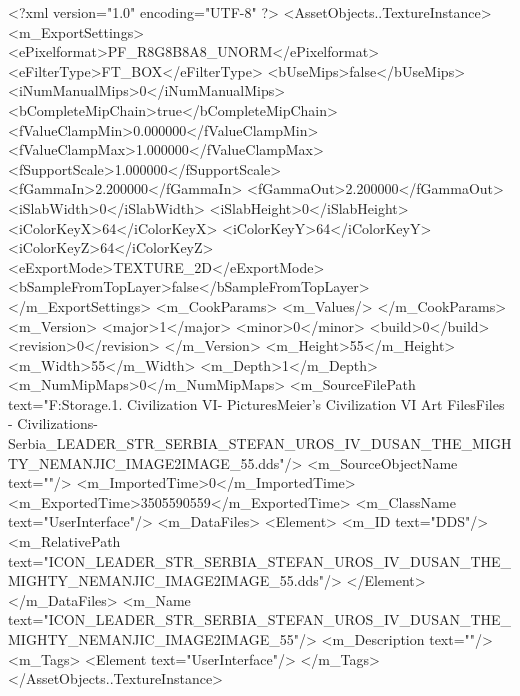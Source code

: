 <?xml version="1.0" encoding="UTF-8" ?>
<AssetObjects..TextureInstance>
	<m_ExportSettings>
		<ePixelformat>PF_R8G8B8A8_UNORM</ePixelformat>
		<eFilterType>FT_BOX</eFilterType>
		<bUseMips>false</bUseMips>
		<iNumManualMips>0</iNumManualMips>
		<bCompleteMipChain>true</bCompleteMipChain>
		<fValueClampMin>0.000000</fValueClampMin>
		<fValueClampMax>1.000000</fValueClampMax>
		<fSupportScale>1.000000</fSupportScale>
		<fGammaIn>2.200000</fGammaIn>
		<fGammaOut>2.200000</fGammaOut>
		<iSlabWidth>0</iSlabWidth>
		<iSlabHeight>0</iSlabHeight>
		<iColorKeyX>64</iColorKeyX>
		<iColorKeyY>64</iColorKeyY>
		<iColorKeyZ>64</iColorKeyZ>
		<eExportMode>TEXTURE_2D</eExportMode>
		<bSampleFromTopLayer>false</bSampleFromTopLayer>
	</m_ExportSettings>
	<m_CookParams>
		<m_Values/>
	</m_CookParams>
	<m_Version>
		<major>1</major>
		<minor>0</minor>
		<build>0</build>
		<revision>0</revision>
	</m_Version>
	<m_Height>55</m_Height>
	<m_Width>55</m_Width>
	<m_Depth>1</m_Depth>
	<m_NumMipMaps>0</m_NumMipMaps>
	<m_SourceFilePath text="F:\Mod Storage\2.1. Civilization VI\Mods\Archive - Pictures\Sid Meier's Civilization VI Art Files\Art Files - Civilizations\Civilization - Serbia\ICON_LEADER_STR_SERBIA_STEFAN_UROS_IV_DUSAN_THE_MIGHTY_NEMANJIC_IMAGE2IMAGE_55.dds"/>
	<m_SourceObjectName text=""/>
	<m_ImportedTime>0</m_ImportedTime>
	<m_ExportedTime>3505590559</m_ExportedTime>
	<m_ClassName text="UserInterface"/>
	<m_DataFiles>
		<Element>
			<m_ID text="DDS"/>
			<m_RelativePath text="ICON_LEADER_STR_SERBIA_STEFAN_UROS_IV_DUSAN_THE_MIGHTY_NEMANJIC_IMAGE2IMAGE_55.dds"/>
		</Element>
	</m_DataFiles>
	<m_Name text="ICON_LEADER_STR_SERBIA_STEFAN_UROS_IV_DUSAN_THE_MIGHTY_NEMANJIC_IMAGE2IMAGE_55"/>
	<m_Description text=""/>
	<m_Tags>
		<Element text="UserInterface"/>
	</m_Tags>
</AssetObjects..TextureInstance>

